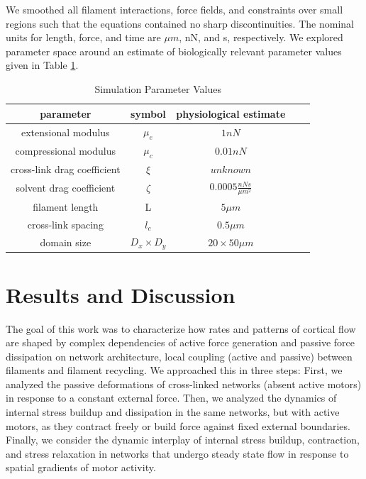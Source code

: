 \documentclass[10pt,letterpaper]{article}
\begin{document}
We smoothed all filament interactions, force fields, and constraints over small regions such that the equations contained no sharp discontinuities. The nominal units for length, force, and time are $\mu m$, nN, and s, respectively.  We explored parameter space around an estimate of biologically relevant parameter values given in Table \ref{table:para}. 

\begin{table}[h]
\centering
\caption{Simulation Parameter Values}
\label{table:para}
\begin{tabular}{|c|c|c|c|c|}
\hline
{\bf parameter}             & {\bf symbol} & {\bf physiological estimate}          \\ \hline
extensional modulus         & $\mu_e$        & $1 nN $                                               \\
compressional modulus             & $\mu_c$     & $ 0.01 nN $                           \\
cross-link drag coefficient & $\xi$      & $unknown $              \\
solvent drag coefficient     & $\zeta$        & $0.0005 \frac{nN s}{\mu m^2} $      \\
filament length             & L            & $5 \mu m$                                          \\
cross-link spacing          & $l_c$        & $0.5 \mu m$                                         \\
domain size                 & $D_x\times D_y$            & $20\times 50 \mu m$                                 \\ \hline
\end{tabular}
\end{table}



\section*{Results and Discussion}
The goal of this work was to characterize how rates and patterns of cortical flow are shaped by complex dependencies of active force generation and passive force dissipation on network architecture, local coupling (active and passive) between filaments and filament recycling.  We approached this in three steps: First, we analyzed the passive deformations of cross-linked networks (absent active motors) in response to a constant external force. Then, we analyzed the dynamics of internal stress buildup and dissipation in the same networks, but with active motors, as they contract freely or build force against fixed external boundaries. Finally, we consider the dynamic interplay of internal stress buildup, contraction, and stress relaxation in networks that undergo steady state flow in response to spatial gradients of motor activity.
\end{document}
